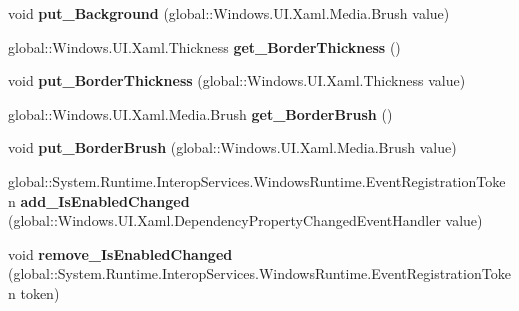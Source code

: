 \begin{DoxyCompactItemize}
\item 
\mbox{\label{interface_windows_1_1_u_i_1_1_xaml_1_1_controls_1_1_i_control_a3ff4d65a6273f87cf0e2f0258e70a641}} 
void {\bfseries put\+\_\+\+Background} (global\+::\+Windows.\+U\+I.\+Xaml.\+Media.\+Brush value)
\item 
\mbox{\label{interface_windows_1_1_u_i_1_1_xaml_1_1_controls_1_1_i_control_a368b66c8a1f1040880bdefc07e7cb85b}} 
global\+::\+Windows.\+U\+I.\+Xaml.\+Thickness {\bfseries get\+\_\+\+Border\+Thickness} ()
\item 
\mbox{\label{interface_windows_1_1_u_i_1_1_xaml_1_1_controls_1_1_i_control_ab6fd6e86f54e793f12961312b55b372f}} 
void {\bfseries put\+\_\+\+Border\+Thickness} (global\+::\+Windows.\+U\+I.\+Xaml.\+Thickness value)
\item 
\mbox{\label{interface_windows_1_1_u_i_1_1_xaml_1_1_controls_1_1_i_control_a1abfbeb7516aaa3813e93972e9cd5675}} 
global\+::\+Windows.\+U\+I.\+Xaml.\+Media.\+Brush {\bfseries get\+\_\+\+Border\+Brush} ()
\item 
\mbox{\label{interface_windows_1_1_u_i_1_1_xaml_1_1_controls_1_1_i_control_a4c2d7d5305d305b773e5ad689a8890bd}} 
void {\bfseries put\+\_\+\+Border\+Brush} (global\+::\+Windows.\+U\+I.\+Xaml.\+Media.\+Brush value)
\item 
\mbox{\label{interface_windows_1_1_u_i_1_1_xaml_1_1_controls_1_1_i_control_a37411d40405261227231f8142b22f8e0}} 
global\+::\+System.\+Runtime.\+Interop\+Services.\+Windows\+Runtime.\+Event\+Registration\+Token {\bfseries add\+\_\+\+Is\+Enabled\+Changed} (global\+::\+Windows.\+U\+I.\+Xaml.\+Dependency\+Property\+Changed\+Event\+Handler value)
\item 
\mbox{\label{interface_windows_1_1_u_i_1_1_xaml_1_1_controls_1_1_i_control_a9536f630fb699b5e3696f745e6f1fd92}} 
void {\bfseries remove\+\_\+\+Is\+Enabled\+Changed} (global\+::\+System.\+Runtime.\+Interop\+Services.\+Windows\+Runtime.\+Event\+Registration\+Token token)

\end{DoxyCompactItemize}
